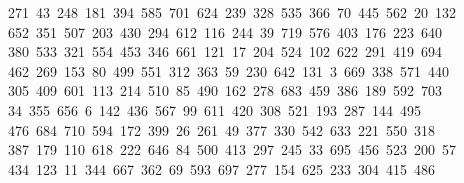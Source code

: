 \begin{tabbing}
\>\ 271\ 43\ 248\ 181\ 394\ 585\ 701\ 624\ 239\ 328\ 535\ 366\ 70\ 445\ 562\ 20\ 132\\[0pt]
\>\ 652\ 351\ 507\ 203\ 430\ 294\ 612\ 116\ 244\ 39\ 719\ 576\ 403\ 176\ 223\ 640\ \\[0pt]
\ 380\ 533\ 321\ 554\ 453\ 346\ 661\ 121\ 17\ 204\ 524\ 102\ 622\ 291\ 419\ 694\\[0pt]
\>\ 462\ 269\ 153\ 80\ 499\ 551\ 312\ 363\ 59\ 230\ 642\ 131\ 3\ 669\ 338\ 571\ 440\\[0pt]
\>\ 305\ 409\ 601\ 113\ 214\ 510\ 85\ 490\ 162\ 278\ 683\ 459\ 386\ 189\ 592\ 703\ \\[0pt]
\ 34\ 355\ 656\ 6\ 142\ 436\ 567\ 99\ 611\ 420\ 308\ 521\ 193\ 287\ 144\ 495\ \\[0pt]
\ 476\ 684\ 710\ 594\ 172\ 399\ 26\ 261\ 49\ 377\ 330\ 542\ 633\ 221\ 550\ 318\\[0pt]
\>\ 387\ 179\ 110\ 618\ 222\ 646\ 84\ 500\ 413\ 297\ 245\ 33\ 695\ 456\ 523\ 200\ 57\\[0pt]
\ 434\ 123\ 11\ 344\ 667\ 362\ 69\ 593\ 697\ 277\ 154\ 625\ 233\ 304\ 415\ 486\ \\[0pt]

\end{tabbing}
